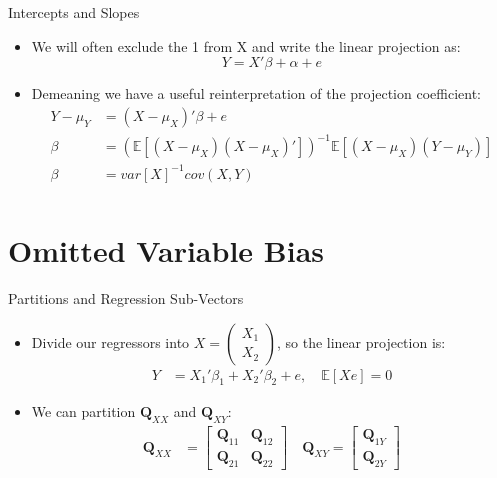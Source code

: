 \documentclass[aspectratio=169]{beamer}
\numberwithin{equation}{section}
\begin{document}
\begin{frame}{Intercepts and Slopes}
\begin{itemize}
\item We will often exclude the 1 from X and write the linear projection as:
$$Y=X'\beta+\alpha+e$$
\item Demeaning we have a useful reinterpretation of the projection coefficient:
\begin{align*}
Y-\mu_Y&=(X-\mu_X)'\beta+e\\
\beta&=(\mathbb{E}[(X-\mu_X)(X-\mu_X)'])^{-1}\mathbb{E}[(X-\mu_X)(Y-\mu_Y)]\\
\beta&=var[X]^{-1}cov(X,Y)\\
\end{align*}
\end{itemize}
\end{frame}

\section{Omitted Variable Bias}

\begin{frame}{Partitions and Regression Sub-Vectors}
\begin{itemize}
\item Divide our regressors into $X=\begin{pmatrix} X_1\\ X_2\end{pmatrix}$, so the linear projection is:
\begin{align*}
Y&=X_1'\beta_1+X_2'\beta_2+e, \quad \mathbb{E}[Xe]=0
\end{align*}
\item We can partition $\mathbf{Q}_{XX}$ and $\mathbf{Q}_{XY}$:
\begin{align*}
\mathbf{Q}_{XX}&=\begin{bmatrix} \mathbf{Q}_{11} &\mathbf{Q}_{12}\\\mathbf{Q}_{21}&\mathbf{Q}_{22}\end{bmatrix} \quad
\mathbf{Q}_{XY}=\begin{bmatrix} \mathbf{Q}_{1Y}\\\mathbf{Q}_{2Y}\end{bmatrix}
\end{align*}
\end{itemize}
\end{frame}
\end{document}
